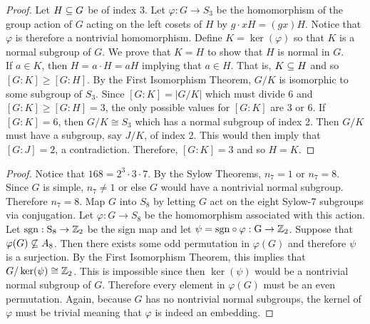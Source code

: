 \documentclass[../AlgebraQualSolutions.tex]{subfiles}
\begin{document}
\begin{proof}
    Let $H \subseteq G$ be of index 3. Let $\varphi: G \to S_3$ be the homomorphism of the group action of $G$ acting on the left cosets of $H$ by $g\cdot xH = (gx)H$. Notice that $\varphi$ is therefore a nontrivial homomorphism. Define $K = \ker(\varphi)$ so that $K$ is a normal subgroup of $G$. We prove that $K = H$ to show that $H$ is normal in $G$.\\

    If $a \in K$, then $H = a\cdot H = aH$ implying that $a \in H$. That is, $K \subseteq H$ and so $[G:K] \geq [G:H]$. By the First Isomorphism Theorem, $G/K$ is isomorphic to some subgroup of $S_3$. Since $[G:K] = |G/K|$ which must divide 6 and $[G:K] \geq [G:H] = 3$, the only possible values for $[G:K]$ are 3 or 6. If $[G:K] =6$, then $G/K \cong S_3$ which has a normal subgroup of index 2. Then $G/K$ must have a subgroup, say $J/K$, of index 2. This would then imply that $[G:J] =2$, a contradiction. Therefore, $[G:K] = 3$ and so $H = K$.
\end{proof}

\begin{proof}
    Notice that $168 = 2^3 \cdot 3 \cdot 7$. By the Sylow Theorems, $n_7 = 1$ or $n_7 = 8$. Since $G$ is simple, $n_7 \neq 1$ or else $G$ would have a nontrivial normal subgroup. Therefore $n_7 = 8$. Map $G$ into $S_8$ by letting $G$ act on the eight Sylow-7 subgroups via conjugation. Let $\varphi: G \to S_8$ be the homomorphism associated with this action. Let $\rm{sgn}: S_8 \to \mathbb{Z}_2$ be the sign map and let $\psi = \rm{sgn}\circ \varphi: G \to \mathbb{Z}_2$. Suppose that $\varphi(G) \not\subseteq A_8$. Then there exists some odd permutation in $\varphi(G)$ and therefore $\psi$ is a surjection. By the First Isomorphism Theorem, this implies that $G/\ker(\psi) \cong \mathbb{Z}_2$. This is impossible since then $\ker(\psi)$ would be a nontrivial normal subgroup of $G$. Therefore every element in $\varphi(G)$ must be an even permutation. Again, because $G$ has no nontrivial normal subgroups, the kernel of $\varphi$ must be trivial meaning that $\varphi$ is indeed an embedding.
\end{proof}
\end{document}
